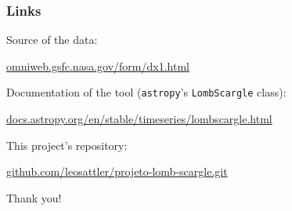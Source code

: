 \documentclass{beamer}
\begin{document}
\begin{frame}
\frametitle{Links}
Source of the data: \\
\begin{center}
\href{https://omniweb.gsfc.nasa.gov/form/dx1.html}{omniweb.gsfc.nasa.gov/form/dx1.html}
\end{center}
\vspace{2mm}
Documentation of the tool (\texttt{astropy}'s \texttt{LombScargle} class): \\
\begin{center}
\href{https://docs.astropy.org/en/stable/timeseries/lombscargle.html}{docs.astropy.org/en/stable/timeseries/lombscargle.html}
\end{center}
\vspace{2mm}
This project's repository: \\
\begin{center}
\href{https://github.com/leosattler/projeto-lomb-scargle.git}{github.com/leosattler/projeto-lomb-scargle.git}
\end{center}
\vspace{10mm}
\center
Thank you!
\end{frame}
\end{document}
